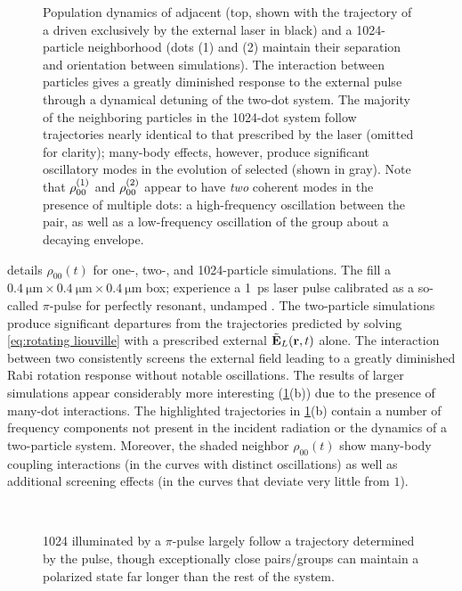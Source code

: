 \begin{figure}
  
  \caption{\label{fig:density stats}Population dynamics of adjacent \qds{} (top, shown with the trajectory of a \qd{} driven exclusively by the external laser in black) and a 1024-particle neighborhood (dots (1) and (2) maintain their separation and orientation between simulations).
    The interaction between particles gives a greatly diminished response to the external pulse through a dynamical detuning of the two-dot system.
    The majority of the neighboring particles in the 1024-dot system follow trajectories nearly identical to that prescribed by the laser (omitted for clarity); many-body effects, however, produce significant oscillatory modes in the evolution of selected \qds{} (shown in gray).
    Note that $\rho_{00}^{\qty(1)}$ and $\rho_{00}^{\qty(2)}$ appear to have \emph{two} coherent modes in the presence of multiple dots: a high-frequency oscillation between the pair, as well as a low-frequency oscillation of the group about a decaying envelope.
}
\end{figure}

 details $\rho_{00}(t)$ for one-, two-, and 1024-particle simulations.
The \qds{} fill a $\SI{0.4}{\micro\meter} \times \SI{0.4}{\micro\meter} \times \SI{0.4}{\micro\meter}$ box; experience a \SI{1}{\pico\second} laser pulse calibrated as a so-called $\pi$-pulse for perfectly resonant, undamped \qds{}.
The two-particle simulations produce significant departures from the trajectories predicted by solving \cref{eq:rotating liouville} with a prescribed external $\tilde{\vb{E}}_L(\vb{r}, t)$ alone.
The interaction between two \qds{} consistently screens the external field leading to a greatly diminished Rabi rotation response without notable oscillations.
The results of larger simulations appear considerably more interesting (\cref{fig:density stats}(b)) due to the presence of many-dot interactions.
The highlighted trajectories in \cref{fig:density stats}(b) contain a number of frequency components not present in the incident radiation or the dynamics of a two-particle system.
Moreover, the shaded neighbor $\rho_{00}(t)$ show many-body coupling interactions (in the curves with distinct oscillations) as well as additional screening effects (in the curves that deviate very little from $1$).

\begin{figure}
  \centering
   \\
  \caption{\label{fig:polarization vis}
    1024 \qds{} illuminated by a $\pi$-pulse largely follow a trajectory determined by the pulse, though exceptionally close pairs/groups can maintain a polarized state far longer than the rest of the system.
  }
\end{figure}

